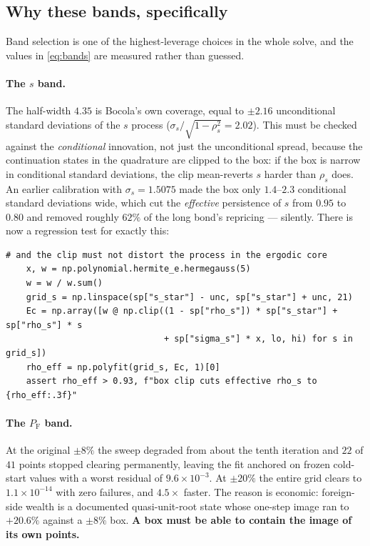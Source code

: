 \documentclass[11pt]{article}
\numberwithin{equation}{section}
\newcommand{\code}[1]{\texttt{\small #1}}
\newcommand{\F}{\mathrm{F}}
\theoremstyle{definition}
\theoremstyle{plain}
\theoremstyle{remark}
\begin{document}
\subsection{Why these bands, specifically}

Band selection is one of the highest-leverage choices in the whole solve, and the
values in \eqref{eq:bands} are measured rather than guessed.

\paragraph{The $s$ band.} The half-width $4.35$ is Bocola's own coverage, equal to
$\pm2.16$ unconditional standard deviations of the $s$ process
($\sigma_s/\sqrt{1-\rho_s^{2}}=2.02$). This must be checked against the
\emph{conditional} innovation, not just the unconditional spread, because the
continuation states in the quadrature are clipped to the box: if the box is narrow in
conditional standard deviations, the clip mean-reverts $s$ harder than $\rho_s$ does.
An earlier calibration with $\sigma_s=1.5075$ made the box only $1.4$--$2.3$
conditional standard deviations wide, which cut the \emph{effective} persistence of
$s$ from $0.95$ to $0.80$ and removed roughly $62\%$ of the long bond's repricing ---
silently. There is now a regression test for exactly this:

\begin{lstlisting}[caption={Guarding against a box that distorts the shock process. \code{tests/test\_state\_grid.py}.}]
    # and the clip must not distort the process in the ergodic core
    x, w = np.polynomial.hermite_e.hermegauss(5)
    w = w / w.sum()
    grid_s = np.linspace(sp["s_star"] - unc, sp["s_star"] + unc, 21)
    Ec = np.array([w @ np.clip((1 - sp["rho_s"]) * sp["s_star"] + sp["rho_s"] * s
                               + sp["sigma_s"] * x, lo, hi) for s in grid_s])
    rho_eff = np.polyfit(grid_s, Ec, 1)[0]
    assert rho_eff > 0.93, f"box clip cuts effective rho_s to {rho_eff:.3f}"
\end{lstlisting}

\paragraph{The $P_\F$ band.} At the original $\pm8\%$ the sweep degraded from about
the tenth iteration and $22$ of $41$ points stopped clearing permanently, leaving the
fit anchored on frozen cold-start values with a worst residual of $9.6\times10^{-3}$.
At $\pm20\%$ the entire grid clears to $1.1\times10^{-14}$ with zero failures, and
$4.5\times$ faster. The reason is economic: foreign-side wealth is a documented
quasi-unit-root state whose one-step image ran to $+20.6\%$ against a $\pm8\%$ box.
\textbf{A box must be able to contain the image of its own points.}
\end{document}
